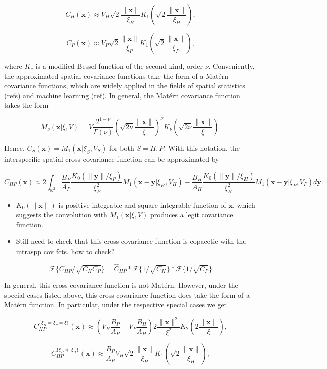 \documentclass{article}
\begin{document}
\[C_H(\pmb x)\approx V_H\sqrt2\frac{\|\pmb x\|}{\xi_H}K_1\left(\sqrt2\frac{\|\pmb x\|}{\xi_H}\right),\]

\[C_P(\pmb x)\approx V_P\sqrt2\frac{\|\pmb x\|}{\xi_P}K_1\left(\sqrt2\frac{\|\pmb x\|}{\xi_P}\right),\]

where \(K_\nu\) is a modified Bessel function of the second kind, order
\(\nu\). Conveniently, the approximated spatial covariance functions
take the form of a Matérn covariance functions, which are widely applied
in the fields of spatial statistics (refs) and machine learning (ref).
In general, the Matérn covariance function takes the form

\[M_\nu(\pmb x|\xi,V)=V\frac{2^{1-\nu}}{\Gamma(\nu)}\left(\sqrt{2\nu}\frac{\|\pmb x\|}{\xi}\right)^\nu K_\nu\left(\sqrt{2\nu}\frac{\|\pmb x\|}{\xi}\right).\]

Hence, \(C_S(\pmb x)=M_1(\pmb x|\xi_S,V_S)\) for both \(S=H,P\). With
this notation, the interspecific spatial cross-covariance function can
be approximated by

\[C_{HP}(\pmb x)\approx 2\int_{\mathbb R^2}\frac{B_P}{A_P}\frac{K_0(\|\pmb y\|/\xi_P)}{\xi_P^2}M_1(\pmb x-\pmb y|\xi_H,V_H)-\frac{B_H}{A_H}\frac{K_0(\|\pmb y\|/\xi_H)}{\xi_H^2}M_1(\pmb x-\pmb y|\xi_P,V_P)d\pmb y.\]

\begin{itemize}
\item
  \(K_0(\|\pmb x\|)\) is positive integrable and square integrable
  function of \(\pmb x\), which suggests the convolution with
  \(M_1(\pmb x|\xi,V)\) produces a legit covariance function.
\item
  Still need to check that this cross-covariance function is copacetic
  with the intraspp cov fcts. how to check?
\end{itemize}

\[\mathcal F\{C_{HP}/\sqrt{C_HC_P}\}=\hat C_{HP}*\mathcal F\{1/\sqrt{C_H}\}*\mathcal F\{1/\sqrt{C_P}\}\]

In general, this cross-covariance function is not Matérn. However, under
the special cases listed above, this cross-covariance function does take
the form of a Matérn function. In particular, under the respective
special cases we get

\[C_{HP}^{\{\xi_H=\xi_P=\xi\}}(\pmb x)\approx\left(V_H\frac{B_P}{A_P}-V_P\frac{B_H}{A_H}\right)2\frac{\|\pmb x\|^2}{\xi^2}K_2\left(2\frac{\|\pmb x\|}{\xi}\right),\]

\[C_{HP}^{\{\xi_P\ll\xi_H\}}(\pmb x)\approx\frac{B_P}{A_P}V_H\sqrt2\frac{\|\pmb x\|}{\xi_H}K_1\left(\sqrt2\frac{\|\pmb x\|}{\xi_H}\right),\]
\end{document}
